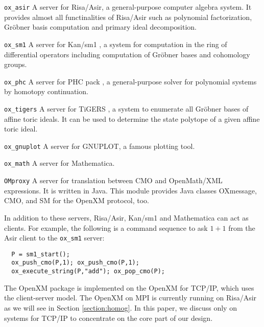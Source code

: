 \begin{description}
\item{\tt ox\_asir}
A server for Risa/Asir, a general-purpose computer algebra
system. It provides almost
all functinalities of Risa/Asir such as polynomial factorization,
Gr\"obner basis computation and primary ideal decomposition.
\item{\tt ox\_sm1}
A server for Kan/sm1 \cite{kan}, a system for computation in 
the ring of differential operators including computation of Gr\"obner bases
and cohomology groups.
\item {\tt ox\_phc}
A server for PHC pack \cite{phc}, a general-purpose solver for
polynomial systems by homotopy continuation. 
\item {\tt ox\_tigers}
A server for TiGERS \cite{tigers}, a system to enumerate
all Gr\"obner bases of affine toric ideals.
It can be used to determine the state polytope
of a given affine toric ideal.
\item {\tt ox\_gnuplot}
A server for GNUPLOT, a famous plotting tool.
\item {\tt ox\_math}
A server for Mathematica.
\item {\tt OMproxy}
A server for translation between CMO and OpenMath/XML expressions.
It is written in Java.
This module provides Java classes OXmessage, CMO, and SM
for the OpenXM protocol, too.
\end{description}
In addition to these servers, Risa/Asir, Kan/sm1 and Mathematica
can act as clients. 
For example, the following is a command sequence to ask $1+1$ from
the Asir client to the {\tt ox\_sm1} server:
\begin{verbatim}
  P = sm1_start();
  ox_push_cmo(P,1); ox_push_cmo(P,1);
  ox_execute_string(P,"add"); ox_pop_cmo(P);
\end{verbatim}
The OpenXM package is implemented on the  OpenXM for TCP/IP, 
which uses the client-server model.
The OpenXM on MPI \cite{MPI} is currently running on Risa/Asir
as we will see in Section \ref{section:homog}.
In this paper, we discuss only on systems for TCP/IP
to concentrate on the core part of our design.







